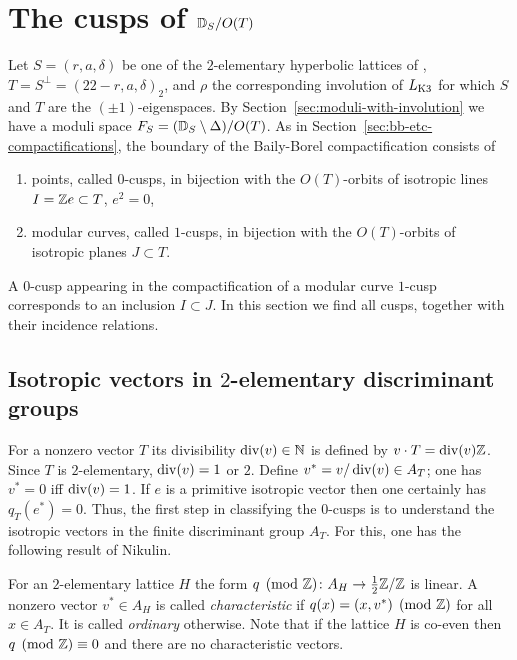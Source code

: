 \documentclass{amsart}
\begin{document}
\section{The cusps of ${\mathbb D}_S/O(T)$}
\label{sec:cusps}


Let $S=(r,a,\delta)$ be one of the $2$-elementary hyperbolic lattices
of \fign, $T=S^\perp=(22-r,a,\delta)_2$, and $\rho$ the corresponding
involution of $L_{\rm K3}$ for which $S$ and $T$ are the
$(\pm 1)$-eigenspaces. By Section~\ref{sec:moduli-with-involution} we
have a moduli space $F_S = ({\mathbb D}_S\setminus\Delta)/O(T)$.  As in
Section~\ref{sec:bb-etc-compactifications}, the boundary of the
Baily-Borel compactification consists of

\begin{enumerate}
\item points, called $0$-cusps, in bijection with the $O(T)$-orbits of
  isotropic lines $I={\mathbb Z} e\subset T$, $e^2=0$, \vspace{1pt}
\item modular curves, called $1$-cusps, in bijection with the $O(T)$-orbits
of isotropic planes $J\subset T$.
\end{enumerate}

A $0$-cusp appearing in the compactification of a modular curve $1$-cusp
corresponds to an inclusion $I\subset J$. In this section we find all cusps,
together with their incidence relations.

\subsection{Isotropic vectors in $2$-elementary discriminant groups}
\label{sec:iso-AT}

For a nonzero vector $T$ its divisibility $\operatorname{div}(v)\in{\mathbb N}$ is defined by
$v \cdot T = \operatorname{div}(v){\mathbb Z}$. Since $T$ is $2$-elementary, $\operatorname{div}(v)=1$ or
$2$. Define $v^* = v/\operatorname{div}(v) \in A_T$; one has $v^*=0$ iff
$\operatorname{div}(v)=1$. If $e$ is a primitive isotropic vector then one certainly
has $q_T(e^*)=0$. Thus, the first step in classifying the $0$-cusps is
to understand the isotropic vectors in the finite discriminant group
$A_T$. For this, one has the following result of Nikulin.

\begin{definition}
  For an $2$-elementary lattice $H$ the form $q \pmod{{\mathbb Z}}\colon A_H\to
  \frac12{\mathbb Z} / {\mathbb Z}$ is linear. A nonzero vector $v^*\in A_H$ is called
  \emph{characteristic} if $q(x) = (x,v^*) \pmod {{\mathbb Z}}$ for all $x\in
  A_T$. It is called \emph{ordinary} otherwise. Note that if the
  lattice $H$ is co-even then $q\pmod{{\mathbb Z}}\equiv 0$ and there are no
  characteristic vectors.
\end{definition}
\end{document}
